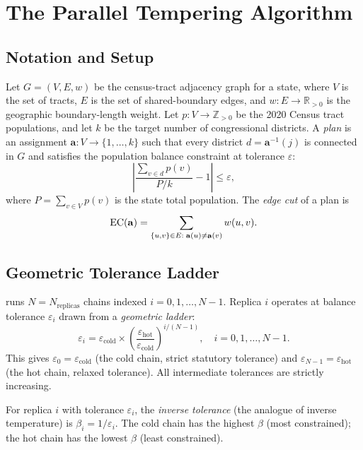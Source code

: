 \section{The Parallel Tempering Algorithm}
\label{sec:algorithm}

\subsection{Notation and Setup}

Let $G = (V, E, w)$ be the census-tract adjacency graph for a state, where
$V$ is the set of tracts, $E$ is the set of shared-boundary edges, and
$w: E \to \mathbb{R}_{>0}$ is the geographic boundary-length weight.
Let $p: V \to \mathbb{Z}_{>0}$ be the 2020 Census tract populations, and let
$k$ be the target number of congressional districts.
A \emph{plan} is an assignment $\mathbf{a}: V \to \{1,\ldots,k\}$ such that
every district $d = \mathbf{a}^{-1}(j)$ is connected in $G$ and satisfies the
population balance constraint at tolerance $\varepsilon$:
\[
  \left|\frac{\sum_{v \in d} p(v)}{P/k} - 1\right| \le \varepsilon,
\]
where $P = \sum_{v \in V} p(v)$ is the state total population.
The \emph{edge cut} of a plan is
\[
  \mathrm{EC}(\mathbf{a}) = \sum_{\{u,v\} \in E:\; \mathbf{a}(u) \ne \mathbf{a}(v)} w(u,v).
\]

\subsection{Geometric Tolerance Ladder}
\label{sec:ladder}

\pt{} runs $N = N_{\mathrm{replicas}}$ chains indexed $i = 0, 1, \ldots, N-1$.
Replica $i$ operates at balance tolerance $\varepsilon_i$ drawn from a
\emph{geometric ladder}:
\[
  \varepsilon_i = \varepsilon_{\mathrm{cold}}
    \times \left(\frac{\varepsilon_{\mathrm{hot}}}{\varepsilon_{\mathrm{cold}}}\right)^{i/(N-1)},
  \quad i = 0, 1, \ldots, N-1.
\]
This gives $\varepsilon_0 = \varepsilon_{\mathrm{cold}}$ (the cold chain, strict statutory
tolerance) and $\varepsilon_{N-1} = \varepsilon_{\mathrm{hot}}$ (the hot chain,
relaxed tolerance).
All intermediate tolerances are strictly increasing.

\begin{definition}
\label{def:beta}
For replica $i$ with tolerance $\varepsilon_i$, the \emph{inverse tolerance}
(the analogue of inverse temperature) is $\beta_i = 1 / \varepsilon_i$.
The cold chain has the highest $\beta$ (most constrained); the hot chain has
the lowest $\beta$ (least constrained).
\end{definition}

